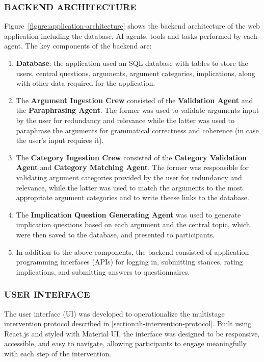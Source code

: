 \documentclass[journal]{IEEEtran}
\begin{document}
\subsubsection{BACKEND ARCHITECTURE}
\label{section:backend-architecture}
Figure~\ref{figure:application-architecture} shows the backend architecture of the web application including the database, AI agents, tools and tasks performed by each agent. The key components of the backend are:
\begin{enumerate}
    \item \textbf{Database}: the application used an SQL database with tables to store the users, central questions, arguments, argument categories, implications, along with other data required for the application.
    \item The \textbf{Argument Ingestion Crew} consisted of the \textbf{Validation Agent} and the \textbf{Paraphrasing Agent}. The former was used to validate arguments input by the user for redundancy and relevance while the latter was used to paraphrase the arguments for grammatical correctness and coherence (in case the user's input requires it).
    \item The \textbf{Category Ingestion Crew} consisted of the \textbf{Category Validation Agent} and \textbf{Category Matching Agent}. The former was responsible for validating argument categories provided by the user for redundancy and relevance, while the latter was used to match the arguments to the most appropriate argument categories and to write theese links to the database.
    \item The \textbf{Implication Question Generating Agent} was used to generate implication questions based on each argument and the central topic, which were then saved to the database, and presented to participants.
    \item In addition to the above components, the backend consisted of application programming interfaces (APIs) for logging in, submitting stances, rating implications, and submitting answers to questionnaires.
\end{enumerate}

\subsubsection{USER INTERFACE}
\label{section:user-interface}
The user interface (UI) was developed to operationalize the multistage intervention protocol described in \ref{section:ih-intervention-protocol}. Built using React.js and styled with Material UI, the interface was designed to be responsive, accessible, and easy to navigate, allowing participants to engage meaningfully with each step of the intervention.
\end{document}

